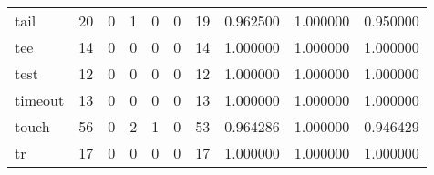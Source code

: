\begin{longtable}{lrrrrrrrrr}
tail      &                                      20 &                                                  0 &                                                  1 &                                                  0 &                                                  0 &                                                 19 &                                           0.962500 &                               1.000000 &                             0.950000 \\
tee       &                                      14 &                                                  0 &                                                  0 &                                                  0 &                                                  0 &                                                 14 &                                           1.000000 &                               1.000000 &                             1.000000 \\
test      &                                      12 &                                                  0 &                                                  0 &                                                  0 &                                                  0 &                                                 12 &                                           1.000000 &                               1.000000 &                             1.000000 \\
timeout   &                                      13 &                                                  0 &                                                  0 &                                                  0 &                                                  0 &                                                 13 &                                           1.000000 &                               1.000000 &                             1.000000 \\
touch     &                                      56 &                                                  0 &                                                  2 &                                                  1 &                                                  0 &                                                 53 &                                           0.964286 &                               1.000000 &                             0.946429 \\
tr        &                                      17 &                                                  0 &                                                  0 &                                                  0 &                                                  0 &                                                 17 &                                           1.000000 &                               1.000000 &                             1.000000 \\

\end{longtable}
